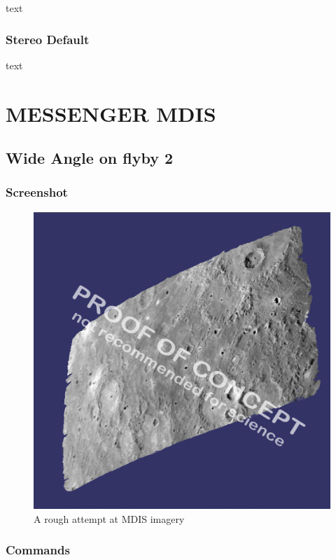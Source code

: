 text

\subsubsection*{Stereo Default}

text

\section{MESSENGER MDIS}

\subsection{Wide Angle on flyby 2}

\subsubsection*{Screenshot}

\begin{figure}[ht]
  \begin{center}
  \includegraphics[width=5in]{images/examples/mdis/mdis_wide_example.png}
  \end{center}
  \caption{ A rough attempt at MDIS imagery }
  \label{fig:mdis_attempt}
\end{figure}

\subsubsection*{Commands}

